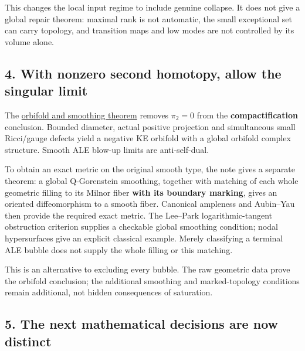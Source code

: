 \documentclass[
  11pt,
]{article}
\begin{document}
This changes the local input regime to include genuine collapse. It does
not give a global repair theorem: maximal rank is not automatic, the
small exceptional set can carry topology, and transition maps and low
modes are not controlled by its volume alone.

\hypertarget{with-nonzero-second-homotopy-allow-the-singular-limit}{%
\subsection{4. With nonzero second homotopy, allow the singular
limit}\label{with-nonzero-second-homotopy-allow-the-singular-limit}}

The \href{20260924_orbifold_smoothing_bridge.md}{orbifold and smoothing
theorem} removes \(\pi_2=0\) from the \textbf{compactification}
conclusion. Bounded diameter, actual positive projection and
simultaneous small Ricci/gauge defects yield a negative KE orbifold with
a global orbifold complex structure. Smooth ALE blow-up limits are
anti-self-dual.

To obtain an exact metric on the original smooth type, the note gives a
separate theorem: a global Q-Gorenstein smoothing, together with
matching of each whole geometric filling to its Milnor fiber
\textbf{with its boundary marking}, gives an oriented diffeomorphism to
a smooth fiber. Canonical ampleness and Aubin--Yau then provide the
required exact metric. The Lee--Park logarithmic-tangent obstruction
criterion supplies a checkable global smoothing condition; nodal
hypersurfaces give an explicit classical example. Merely classifying a
terminal ALE bubble does not supply the whole filling or this matching.

This is an alternative to excluding every bubble. The raw geometric data
prove the orbifold conclusion; the additional smoothing and
marked-topology conditions remain additional, not hidden consequences of
saturation.

\hypertarget{the-next-mathematical-decisions-are-now-distinct}{%
\subsection{5. The next mathematical decisions are now
distinct}\label{the-next-mathematical-decisions-are-now-distinct}}
\end{document}
